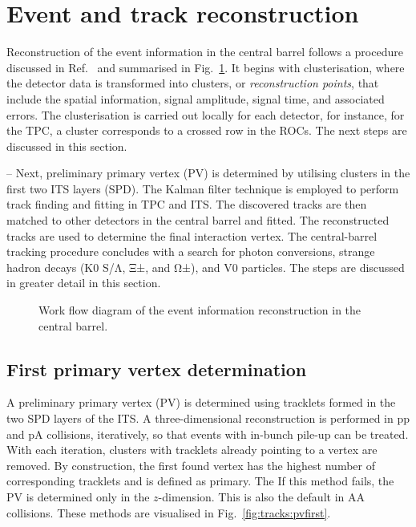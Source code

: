 \section{Event and track reconstruction}

Reconstruction of the event information in the central barrel follows a procedure discussed in Ref.~\cite{} and summarised in Fig.~\ref{fig:tracks:flow}. It begins with clusterisation, where the detector data is transformed into clusters, or \textit{reconstruction points}, that include the spatial information, signal amplitude, signal time, and associated errors. The clusterisation is carried out locally for each detector, for instance, for the TPC, a cluster corresponds to a crossed row in the ROCs.  The next steps are discussed in this section.


--
Next, preliminary primary vertex (PV) is determined by utilising clusters in the first two ITS layers (SPD). The Kalman filter technique is employed to perform track finding and fitting in TPC and ITS. The discovered tracks are then matched to other detectors in the central barrel and fitted. The reconstructed tracks are used to determine the final interaction vertex. The central-barrel tracking procedure concludes with a search for photon conversions, strange hadron decays (K0
S/Λ, Ξ±, and Ω±), and V0 particles. The steps are discussed in greater detail in this section.

\begin{figure}%
\caption{Work flow diagram of the event information reconstruction in the central barrel. \cite{LHCReportMake2023}}
\label{fig:tracks:flow}
\end{figure}

\subsection{First primary vertex determination}

A preliminary primary vertex (PV) is determined using tracklets formed in the two SPD layers of the ITS. A three-dimensional reconstruction is performed in pp and pA collisions, iteratively, so that events with in-bunch pile-up can be treated. With each iteration, clusters with tracklets already pointing to a vertex are removed. By construction, the first found vertex has the highest number of corresponding tracklets and is defined as primary. The If this method fails, the PV is determined only in the $z$-dimension. This is also the default in AA collisions. These methods are visualised in Fig.~\ref{fig:tracks:pvfirst}.

